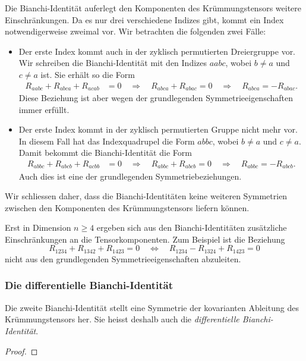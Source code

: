 Die Bianchi-Identität auferlegt den Komponenten des Krümmungstensors
weitere Einschränkungen.
Da es nur drei verschiedene Indizes gibt, kommt ein Index notwendigerweise
zweimal vor.
Wir betrachten die folgenden zwei Fälle:
\begin{itemize}
\item
Der erste Index kommt auch in der zyklisch permutierten
Dreiergruppe vor.
Wir schreiben die Bianchi-Identität mit den Indizes $aabc$,
wobei $b\ne a$ und $c\ne a$ ist.
Sie erhält so die Form
\begin{align*}
R_{aabc}
+
R_{abca}
+
R_{acab}
&=
0
\quad
\Rightarrow
\quad
R_{abca}
+
R_{abac}
=
0
\quad\Rightarrow\quad
R_{abca} = -R_{abac}.
\end{align*}
Diese Beziehung ist aber wegen der grundlegenden Symmetrieeigenschaften
immer erfüllt.
\item
Der erste Index kommt in der zyklisch permutierten Gruppe nicht mehr vor.
In diesem Fall hat das Indexquadrupel die Form $abbc$, wobei $b\ne a$ und
$c\ne a$.
Damit bekommt die Bianchi-Identität die Form
\begin{align*}
R_{abbc}
+
R_{abcb}
+
R_{acbb}
&=
0
\quad \Rightarrow\quad
R_{abbc}
+
R_{abcb}
=
0
\quad\Rightarrow\quad
R_{abbc} = -R_{abcb}.
\end{align*}
Auch dies ist eine der grundlegenden Symmetriebeziehungen.
\end{itemize}
Wir schliessen daher, dass die Bianchi-Identitäten keine weiteren
Symmetrien zwischen den Komponenten des Krümmungstensors liefern
können.

Erst in Dimension $n\ge 4$ ergeben sich aus den Bianchi-Identitäten
zusätzliche Einschränkungen an die Tensorkomponenten.
Zum Beispiel ist die Beziehung
\[
R_{1234}
+
R_{1342}
+
R_{1423}
=
0
\quad\Leftrightarrow\quad
R_{1234}
-
R_{1324}
+
R_{1423}
=
0
\]
nicht aus den grundlegenden Symmetrieeigenschaften abzuleiten.

%
%
\subsubsection{Die differentielle Bianchi-Identität}
Die zweite Bianchi-Identität stellt eine Symmetrie der kovarianten Ableitung
des Krümmungstensors her.
%
%
Sie heisst deshalb auch die \emph{differentielle Bianchi-Identität}.
%
%


\begin{satz}
\end{satz}

\begin{proof}
\end{proof}
